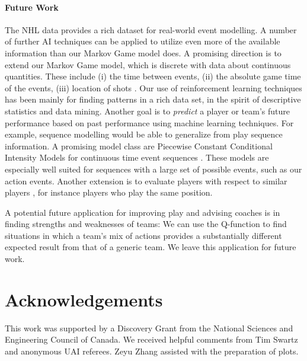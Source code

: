 \documentclass[]{article}
\begin{document}
\paragraph{Future Work} The NHL data provides a rich dataset for real-world event modelling. A number of further AI techniques can be applied to utilize even more of the available information than our Markov Game model does. A promising direction is to extend our Markov Game model, which is discrete with data about continuous quantities. These include (i) the time between events, %
(ii) the absolute game time of the events, %
(iii) location of shots \citep{Krzywicki2005}.
%
Our use of reinforcement learning techniques has been mainly for finding patterns in a rich data set, in the spirit of descriptive statistics and data mining. Another goal is to {\em predict} a player or team's future performance based on past performance using machine learning techniques. %
For example, sequence modelling would be able to generalize from play sequence information. A promising model class are Piecewise Constant Conditional Intensity Models for continuous time event sequences \citep{Gunawardana2011,Parikh2012}. These models are especially well suited for sequences with a large set of possible events, such as our action events. Another extension is to evaluate players with respect to similar players \citep{Cervone2014a}, for instance players who play the same position.

A potential future application for improving play and advising coaches is in finding strengths and weaknesses of teams: We can use the Q-function to find situations in which a team's mix of actions provides a substantially different expected result from that of a generic team.
We leave this application for future work.

\section*{Acknowledgements} This work was supported by a Discovery Grant from the National Sciences and Engineering Council of Canada. We received helpful comments from Tim Swartz and anonymous UAI referees. Zeyu Zhang assisted with the preparation of plots.
\end{document}
